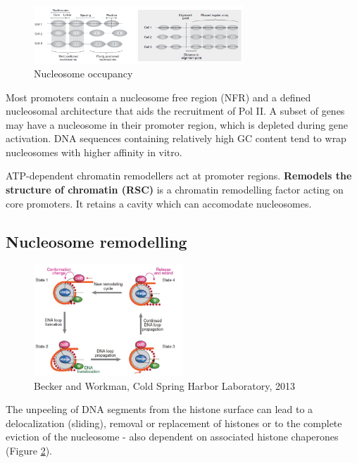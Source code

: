 \begin{figure}
\centering
\includegraphics[width=0.7\textwidth]{../_resources/Screenshot_2022-09-16_at_16-26-04.png}
\caption{Nucleosome occupancy}
\label{fig:nucleosome}
\end{figure}

Most promoters contain a nucleosome free region (NFR) and a defined nucleosomal architecture that aids the recruitment of Pol II. A subset of genes may have a nucleosome in their promoter region, which is depleted during gene activation. DNA sequences containing relatively high GC content tend to wrap nucleosomes with higher affinity in vitro.

ATP-dependent chromatin remodellers act at promoter regions. \textbf{Remodels the structure of chromatin (RSC)} is a chromatin remodelling factor acting on core promoters. It retains a cavity which can accomodate nucleosomes.

\hypertarget{nucleosome-remodelling}{%
\subsection{Nucleosome remodelling}\label{nucleosome-remodelling}}

\begin{figure}
\centering
\includegraphics[width=0.5\textwidth]{../_resources/Screenshot_2022-09-16_at_16-30-29.png}
\caption{Becker and Workman, Cold Spring Harbor Laboratory, 2013}
\label{fig:peeling}
\end{figure}

The unpeeling of DNA segments from the histone surface can lead to a delocalization (sliding), removal or replacement of histones or to the complete eviction of the nucleosome - also dependent on associated histone chaperones (Figure \ref{fig:peeling}).

